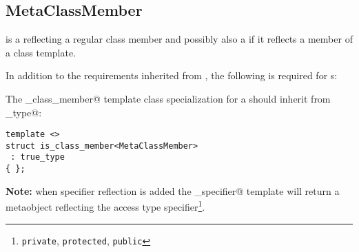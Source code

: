 \subsection{MetaClassMember}
\label{concept-MetaClassMember}

 is a  reflecting a regular class member and possibly
also a  if it reflects a member of a class template.

In addition to the requirements inherited from ,
the following is required for s:

The \verb@is_class_member@ template class specialization for a  should
inherit from \verb@true_type@:

\begin{verbatim}
template <>
struct is_class_member<MetaClassMember>
 : true_type
{ };
\end{verbatim}

\textbf{Note:} when specifier reflection is added the \verb@access_specifier@
template will return a metaobject reflecting the access type
specifier\footnote{\texttt{private}, \texttt{protected}, \texttt{public}}.


